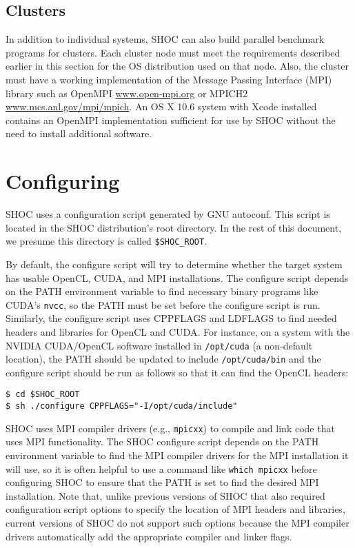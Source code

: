 \documentclass[11pt]{article}
\begin{document}
\subsection{Clusters}
In addition to individual systems, SHOC can also build parallel benchmark
programs for clusters. Each cluster node must meet the requirements described
earlier in this section for the OS distribution used on that node.
Also, the cluster must have a working implementation of the 
Message Passing Interface 
(MPI)\,\cite{gropp-lusk-skjellum:using-mpi2nd,gropp-lusk-thakur:usingmpi2}
library such as OpenMPI \url{www.open-mpi.org} or MPICH2 
\url{www.mcs.anl.gov/mpi/mpich}.
An OS X 10.6 system with Xcode installed contains an OpenMPI implementation
sufficient for use by SHOC without the need to install additional software.


\section{Configuring}\label{sec:configuring}

SHOC uses a configuration script generated by GNU autoconf.  
This script is located in the SHOC distribution's root directory.
In the rest of this document, we presume this directory is called 
\verb+$SHOC_ROOT+.

By default, the configure script will try to determine whether the 
target system has usable OpenCL, CUDA, and MPI installations.  
The configure script depends on the PATH environment variable to find necessary
binary programs like CUDA's \verb+nvcc+, so the PATH must be set before the
configure script is run.
Similarly, the configure script uses CPPFLAGS and LDFLAGS to find needed
headers and libraries for OpenCL and CUDA.
For instance, on a system with the NVIDIA CUDA/OpenCL software installed
in \verb+/opt/cuda+ (a non-default location), the PATH should be updated to include
\verb+/opt/cuda/bin+ and the configure script should be run as follows so that it can
find the OpenCL headers:

\begin{Verbatim}[frame=single]
$ cd $SHOC_ROOT
$ sh ./configure CPPFLAGS="-I/opt/cuda/include"
\end{Verbatim}

SHOC uses MPI compiler drivers (e.g., \verb+mpicxx+) to compile and link code
that uses MPI functionality.
The SHOC configure script depends on the PATH environment variable to find
the MPI compiler drivers for the MPI installation it will use, so it is often
helpful to use a command like \verb+which mpicxx+ before configuring SHOC
to ensure that the PATH is set to find the desired MPI installation.
Note that, unlike previous versions of SHOC that also required configuration
script options to specify the location of MPI headers and libraries, current
versions of SHOC do not support such options because the MPI compiler drivers
automatically add the appropriate compiler and linker flags.
\end{document}
